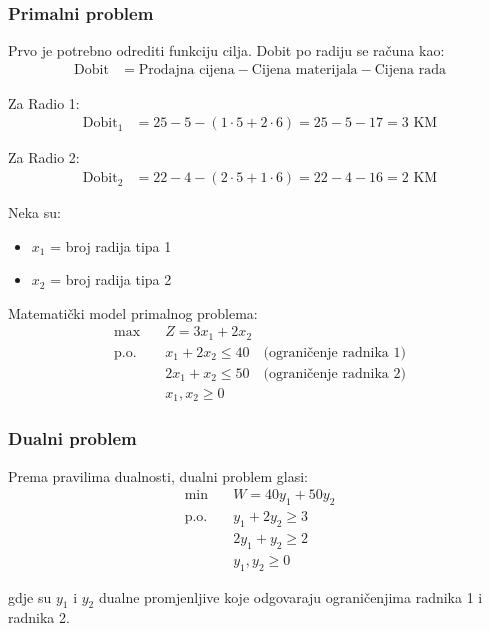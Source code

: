\documentclass[12pt,a4paper]{article}
\begin{document}
\subsubsection{Primalni problem}

Prvo je potrebno odrediti funkciju cilja. Dobit po radiju se računa kao:
\begin{align}
\text{Dobit} &= \text{Prodajna cijena} - \text{Cijena materijala} - \text{Cijena rada}
\end{align}

Za Radio 1:
\begin{align}
\text{Dobit}_1 &= 25 - 5 - (1 \cdot 5 + 2 \cdot 6) = 25 - 5 - 17 = 3 \text{ KM}
\end{align}

Za Radio 2:
\begin{align}
\text{Dobit}_2 &= 22 - 4 - (2 \cdot 5 + 1 \cdot 6) = 22 - 4 - 16 = 2 \text{ KM}
\end{align}

Neka su:
\begin{itemize}
\item $x_1$ = broj radija tipa 1
\item $x_2$ = broj radija tipa 2
\end{itemize}

Matematički model primalnog problema:
\begin{align}
\max \quad & Z = 3x_1 + 2x_2 \\
\text{p.o.} \quad & x_1 + 2x_2 \leq 40 \quad \text{(ograničenje radnika 1)} \\
& 2x_1 + x_2 \leq 50 \quad \text{(ograničenje radnika 2)} \\
& x_1, x_2 \geq 0
\end{align}

\subsubsection{Dualni problem}

Prema pravilima dualnosti, dualni problem glasi:
\begin{align}
\min \quad & W = 40y_1 + 50y_2 \\
\text{p.o.} \quad & y_1 + 2y_2 \geq 3 \\
& 2y_1 + y_2 \geq 2 \\
& y_1, y_2 \geq 0
\end{align}

gdje su $y_1$ i $y_2$ dualne promjenljive koje odgovaraju ograničenjima radnika 1 i radnika 2.
\end{document}
